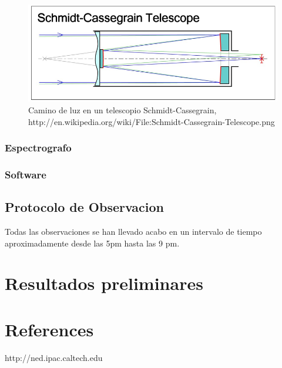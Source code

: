 \documentclass[Proceedings]{ascelike}
\begin{document}
\begin{figure}
\includegraphics[scale=0.4]{SCT2.jpg}
\caption{Camino de luz en un telescopio Schmidt-Cassegrain, http://en.wikipedia.org/wiki/File:Schmidt-Cassegrain-Telescope.png \label{la}}
\end{figure}

\subsubsection{Espectrografo}

\subsubsection{Software}

\subsection{Protocolo de Observacion}

Todas las observaciones se han llevado acabo en un intervalo de tiempo aproximadamente 
desde las 5pm hasta las 9 pm.

\section{Resultados preliminares}

\section{References}

http://ned.ipac.caltech.edu
\end{document}
